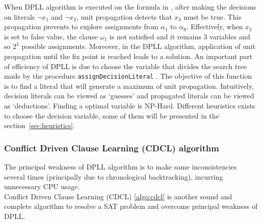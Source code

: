 When DPLL algorithm is executed on the formula in , after making the decisions on literals
$\neg x_1$ and $\neg x_2$, unit propagation detects that $x_3$ must be true. 
This propagation prevents to explore  assignments from $\alpha_1 $ to $\alpha_{8}$. Effectively, when 
$x_3$ is set to false value, the clause $\omega_1$ is not satisfied and it remains 3 variables and so 
$2^3$ possible assignments.
Moreover, in the DPLL algorithm, application of unit propagation until the fix point is reached leads  to a solution. 
An important part of efficiency of DPLL is due to choose the variable that divides the search tree made by
the procedure \texttt{assignDecisionLiteral} . The objective of this function 
is to find a literal that will generate a maximum of unit propagation. Intuitively, decision literals 
can be viewed as ‘guesses’ and propagated literals can be viewed as ‘deductions’. Finding a optimal variable
is NP-Hard. Different heuristics exists to choose the decision variable,
some of them will be presented in the section~\ref{sec:heuristics}.

%
%
\subsubsection{Conflict Driven Clause Learning (CDCL) algorithm}\label{sec:cdcl}
The principal weakness of DPLL algorithm is to make same inconsistencies several times
(principally due to chronological backtracking), incurring unnecessary CPU usage.\\
Conflict Driven Clause Learning (CDCL) \cref{algo:cdcl} is another sound and complete algorithm
to resolve a SAT problem and overcome principal weakness of DPLL.

